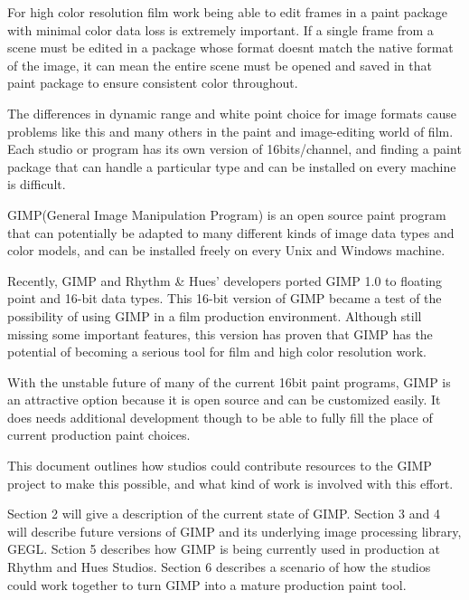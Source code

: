 
For high color resolution film work being able to edit frames in a paint
package with minimal color data loss is extremely important. If a single frame
from a scene must be edited in a package whose format doesnt match the native
format of the image, it can mean the entire scene must be opened and saved in
that paint package to ensure consistent color throughout.   

The differences in dynamic range and white point choice for image formats cause
problems like this and many others in the paint and image-editing world of film.
Each studio or program has its own version of 16bits/channel, and finding a
paint package that can handle a particular type and can be installed on every
machine is difficult.

GIMP(General Image Manipulation Program) is an open source paint program that
can potentially be adapted to many different kinds of image data types and
color models, and can be installed freely on every Unix and Windows machine. 

Recently, GIMP and Rhythm \& Hues' developers ported GIMP 1.0 to floating point
and 16-bit data types. This 16-bit version of GIMP became a test of the
possibility of using GIMP in a film production environment. Although still
missing some important features, this version has proven that GIMP has the
potential of becoming a serious tool for film and high color resolution work. 

With the unstable future of many of the current 16bit paint programs, GIMP is
an attractive option because it is open source and can be customized easily.
It does needs additional development though to be able to fully fill the place
of current production paint choices. 

This document outlines how studios could contribute resources to the GIMP
project to make this possible, and what kind of work is involved with this
effort.  

Section 2 will give a description of the current state of GIMP. Section 3
and 4 will describe future versions of GIMP and its underlying image processing
library, GEGL. Sction 5 describes how GIMP is being currently used in
production at Rhythm and Hues Studios. Section 6 describes a scenario of how
the studios could work together to turn GIMP into a mature production paint
tool.
